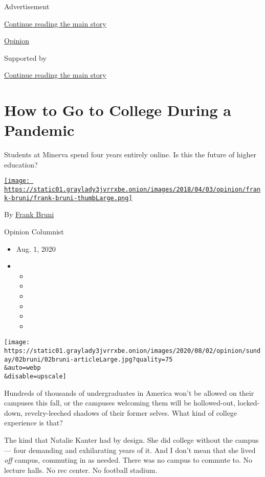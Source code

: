Advertisement

\protect\hyperlink{after-top}{Continue reading the main story}

\href{/section/opinion}{Opinion}

Supported by

\protect\hyperlink{after-sponsor}{Continue reading the main story}

\hypertarget{how-to-go-to-college-during-a-pandemic}{%
\section{How to Go to College During a
Pandemic}\label{how-to-go-to-college-during-a-pandemic}}

Students at Minerva spend four years entirely online. Is this the future
of higher education?

\href{https://www.nytimes3xbfgragh.onion/by/frank-bruni}{\texttt{[image: https://static01.graylady3jvrrxbe.onion/images/2018/04/03/opinion/frank-bruni/frank-bruni-thumbLarge.png]}}

By \href{https://www.nytimes3xbfgragh.onion/by/frank-bruni}{Frank Bruni}

Opinion Columnist

\begin{itemize}
\item
  Aug. 1, 2020
\item
  \begin{itemize}
  \item
  \item
  \item
  \item
  \item
  \item
  \end{itemize}
\end{itemize}

\texttt{[image: https://static01.graylady3jvrrxbe.onion/images/2020/08/02/opinion/sunday/02bruni/02bruni-articleLarge.jpg?quality=75\\\&auto=webp\\\&disable=upscale]}

Hundreds of thousands of undergraduates in America won't be allowed on
their campuses this fall, or the campuses welcoming them will be
hollowed-out, locked-down, revelry-leeched shadows of their former
selves. What kind of college experience is that?

The kind that Natalie Kanter had by design. She did college without the
campus --- four demanding and exhilarating years of it. And I don't mean
that she lived \emph{off} campus, commuting in as needed. There was no
campus to commute to. No lecture halls. No rec center. No football
stadium.

